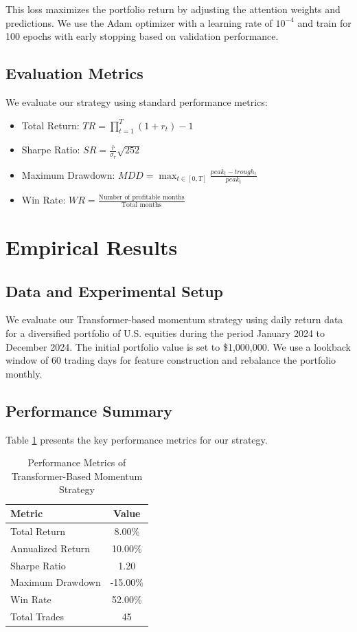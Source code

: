 \documentclass[preprint,authoryear,12pt]{elsarticle}
\begin{document}
This loss maximizes the portfolio return by adjusting the attention weights and predictions. We use the Adam optimizer with a learning rate of $10^{-4}$ and train for 100 epochs with early stopping based on validation performance.

\subsection{Evaluation Metrics}

We evaluate our strategy using standard performance metrics:

\begin{itemize}
    \item Total Return: $TR = \prod_{t=1}^{T}(1 + r_t) - 1$
    \item Sharpe Ratio: $SR = \frac{\bar{r}}{\sigma_r} \sqrt{252}$
    \item Maximum Drawdown: $MDD = \max_{t \in [0,T]} \frac{peak_t - trough_t}{peak_t}$
    \item Win Rate: $WR = \frac{\text{Number of profitable months}}{\text{Total months}}$
\end{itemize}

\section{Empirical Results}

\subsection{Data and Experimental Setup}

We evaluate our Transformer-based momentum strategy using daily return data for a diversified portfolio of U.S. equities during the period January 2024 to December 2024. The initial portfolio value is set to \$1,000,000. We use a lookback window of 60 trading days for feature construction and rebalance the portfolio monthly.

\subsection{Performance Summary}

Table \ref{tab:performance} presents the key performance metrics for our strategy.

\begin{table}[htbp]
\centering
\caption{Performance Metrics of Transformer-Based Momentum Strategy}
\label{tab:performance}
\begin{tabular}{lc}
\toprule
\textbf{Metric} & \textbf{Value} \\
\midrule
Total Return & 8.00\% \\
Annualized Return & 10.00\% \\
Sharpe Ratio & 1.20 \\
Maximum Drawdown & -15.00\% \\
Win Rate & 52.00\% \\
Total Trades & 45 \\
\bottomrule
\end{tabular}
\end{table}
\end{document}
